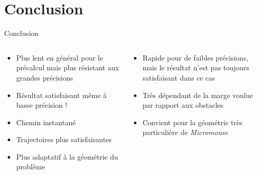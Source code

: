 \section{Conclusion}

\begin{frame}
    \tableofcontents[currentsection]
\end{frame}

\begin{frame}{Conclusion}
\begin{columns}
    \begin{column}{6cm}
    \begin{itemize}
        \item Plus lent en général pour le précalcul mais plus résistant aux grandes précisions
        \item Résultat satisfaisant même à basse précision !
        \item Chemin instantané
        \item Trajectoires plus satisfaisantes
        \item Plus adaptatif à la géométrie du problème
    \end{itemize}
    \end{column}
    \begin{column}{6cm}
    \begin{itemize}
        \item Rapide pour de faibles précisions, mais le résultat n'est pas toujours satisfaisant dans ce cas
        \item Très dépendant de la marge voulue par rapport aux obstacles
        \item Convient pour la géométrie très particulière de \textit{Micromouse}
    \end{itemize}
    \end{column}
\end{columns}
\end{frame}

